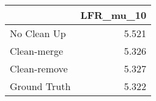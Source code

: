 \begin{tabular}{lr}
\toprule
{} & LFR_mu_10 \\
\midrule
No Clean Up  &     5.521 \\
Clean-merge  &     5.326 \\
Clean-remove &     5.327 \\
Ground Truth &     5.322 \\
\bottomrule
\end{tabular}
